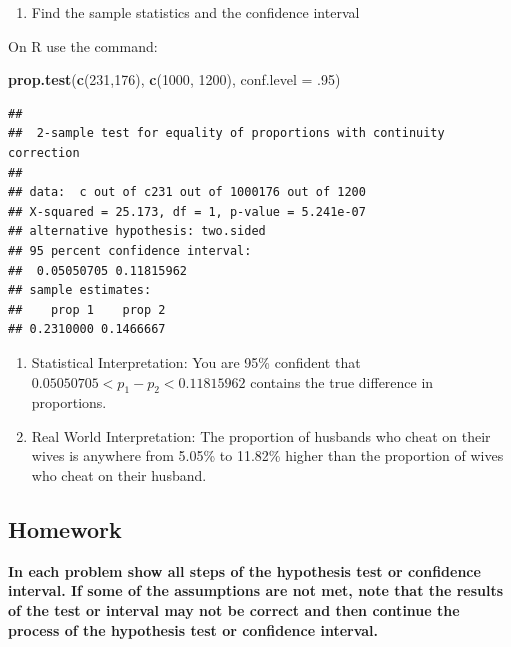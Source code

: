 \documentclass[
]{book}
\newenvironment{Shaded}{\begin{snugshade}}{\end{snugshade}}
\newcommand{\DataTypeTok}[1]{\textcolor[rgb]{0.13,0.29,0.53}{#1}}
\newcommand{\DecValTok}[1]{\textcolor[rgb]{0.00,0.00,0.81}{#1}}
\newcommand{\FloatTok}[1]{\textcolor[rgb]{0.00,0.00,0.81}{#1}}
\newcommand{\KeywordTok}[1]{\textcolor[rgb]{0.13,0.29,0.53}{\textbf{#1}}}
\newcommand{\NormalTok}[1]{#1}
\providecommand{\tightlist}{%
  \setlength{\itemsep}{0pt}\setlength{\parskip}{0pt}}
\begin{document}
\begin{enumerate}
\def\labelenumi{\arabic{enumi}.}
\setcounter{enumi}{2}
\tightlist
\item
  Find the sample statistics and the confidence interval
\end{enumerate}

On R use the command:

\begin{Shaded}
\begin{Highlighting}[]
\KeywordTok{prop.test}\NormalTok{(}\KeywordTok{c}\NormalTok{(}\DecValTok{231}\NormalTok{,}\DecValTok{176}\NormalTok{), }\KeywordTok{c}\NormalTok{(}\DecValTok{1000}\NormalTok{, }\DecValTok{1200}\NormalTok{), }\DataTypeTok{conf.level =} \FloatTok{.95}\NormalTok{)}
\end{Highlighting}
\end{Shaded}

\begin{verbatim}
## 
##  2-sample test for equality of proportions with continuity correction
## 
## data:  c out of c231 out of 1000176 out of 1200
## X-squared = 25.173, df = 1, p-value = 5.241e-07
## alternative hypothesis: two.sided
## 95 percent confidence interval:
##  0.05050705 0.11815962
## sample estimates:
##    prop 1    prop 2 
## 0.2310000 0.1466667
\end{verbatim}

\begin{enumerate}
\def\labelenumi{\arabic{enumi}.}
\setcounter{enumi}{3}
\item
  Statistical Interpretation: You are 95\% confident that \(0.05050705<p_1-p_2<0.11815962\) contains the true difference in proportions.
\item
  Real World Interpretation: The proportion of husbands who cheat on their wives is anywhere from 5.05\% to 11.82\% higher than the proportion of wives who cheat on their husband.
\end{enumerate}

\hypertarget{homework-22}{%
\subsection{Homework}\label{homework-22}}

\textbf{In each problem show all steps of the hypothesis test or confidence interval. If some of the assumptions are not met, note that the results of the test or interval may not be correct and then continue the process of the hypothesis test or confidence interval.}
\end{document}
